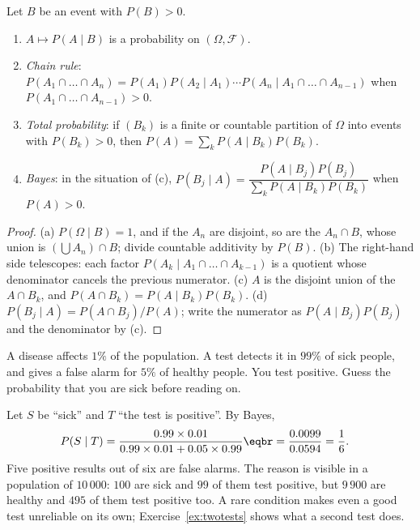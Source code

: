\begin{proposition}\label{prop:bayes}
Let $B$ be an event with $P(B)>0$.
\begin{enumerate}[label=(\alph*)]
\item $A\mapsto P(A\mid B)$ is a probability on $(\Omega,\mathcal F)$.
\item \emph{Chain rule}: $P(A_1\cap\dots\cap A_n)=P(A_1)P(A_2\mid A_1)\cdots P(A_n\mid A_1\cap\dots\cap A_{n-1})$ when
$P(A_1\cap\dots\cap A_{n-1})>0$.
\item \emph{Total probability}: if $(B_k)$ is a finite or countable partition of $\Omega$ into events with
$P(B_k)>0$, then $P(A)=\sum_kP(A\mid B_k)P(B_k)$.
\item \emph{Bayes}: in the situation of (c), $P(B_j\mid A)=\dfrac{P(A\mid B_j)P(B_j)}{\sum_kP(A\mid B_k)P(B_k)}$ when $P(A)>0$.
\end{enumerate}
\end{proposition}
\begin{proof}
(a) $P(\Omega\mid B)=1$, and if the $A_n$ are disjoint, so are the $A_n\cap B$, whose union is
$(\bigcup A_n)\cap B$; divide countable additivity by $P(B)$.
(b) The right-hand side telescopes: each factor $P(A_k\mid A_1\cap\dots\cap A_{k-1})$ is a quotient whose
denominator cancels the previous numerator.
(c) $A$ is the disjoint union of the $A\cap B_k$, and $P(A\cap B_k)=P(A\mid B_k)P(B_k)$.
(d) $P(B_j\mid A)=P(A\cap B_j)/P(A)$; write the numerator as $P(A\mid B_j)P(B_j)$ and the denominator by (c).
\end{proof}

\begin{think}
A disease affects $1\%$ of the population. A test detects it in $99\%$ of sick people, and gives a false alarm
for $5\%$ of healthy people. You test positive. Guess the probability that you are sick before reading on.
\end{think}

\begin{example}\label{ex:medical}
Let $S$ be ``sick'' and $T$ ``the test is positive''. By Bayes,
\[
\begin{aligned}P(S\mid T)&=\frac{0.99\times0.01}{0.99\times0.01+0.05\times0.99}\eqbr=\frac{0.0099}{0.0594}=\frac16.\end{aligned}
\]
Five positive results out of six are false alarms. The reason is visible in a population of $10\,000$: $100$ are
sick and $99$ of them test positive, but $9\,900$ are healthy and $495$ of them test positive too. A rare
condition makes even a good test unreliable on its own; Exercise~\ref{ex:twotests} shows what a second test
does.
\end{example}

